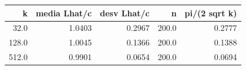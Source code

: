 \begin{tabular}{rrrrr}
\toprule
k & media Lhat/c & desv Lhat/c & n & pi/(2 sqrt k) \\
\midrule
32.0 & 1.0403 & 0.2967 & 200.0 & 0.2777 \\
128.0 & 1.0045 & 0.1366 & 200.0 & 0.1388 \\
512.0 & 0.9901 & 0.0654 & 200.0 & 0.0694 \\
\bottomrule
\end{tabular}
